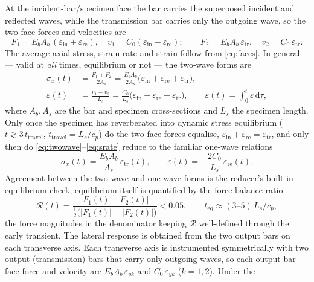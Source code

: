 \documentclass[sn-basic]{sn-jnl}
\newcommand{\Cz}{C_{0}}
\newcommand{\eps}{\varepsilon}
\newcommand{\epsd}{\dot{\varepsilon}}
\begin{document}
At the incident-bar/specimen face the bar carries the superposed incident and
reflected waves, while the transmission bar carries only the outgoing wave, so the
two face forces and velocities are
\begin{equation}
F_1=E_bA_b\,(\eps_{\mathrm{in}}+\eps_{\mathrm{re}}),\quad
v_1=\Cz(\eps_{\mathrm{in}}-\eps_{\mathrm{re}});\qquad
F_2=E_bA_b\,\eps_{\mathrm{tr}},\quad
v_2=\Cz\,\eps_{\mathrm{tr}}.
\label{eq:faces}
\end{equation}
The average axial stress, strain rate and strain follow from \eqref{eq:faces}. In
general --- valid at \emph{all} times, equilibrium or not --- the two-wave forms are
\begin{align}
\sigma_x(t) &= \frac{F_1+F_2}{2A_s}=\frac{E_b A_b}{2 A_s}\big(\eps_{\mathrm{in}}+\eps_{\mathrm{re}}+\eps_{\mathrm{tr}}\big), \label{eq:twowave}\\
\epsd(t)    &= \frac{v_1-v_2}{L_s}=\frac{\Cz}{L_s}\big(\eps_{\mathrm{in}}-\eps_{\mathrm{re}}-\eps_{\mathrm{tr}}\big), \qquad
\eps(t)=\int_0^t \epsd\,\mathrm{d}\tau, \label{eq:srate}
\end{align}
where $A_b,A_s$ are the bar and specimen cross-sections and $L_s$ the specimen
length. Only once the specimen has reverberated into dynamic stress equilibrium
($t\gtrsim 3\,t_{\mathrm{travel}}$, $t_{\mathrm{travel}}=L_s/c_p$) do the two face
forces equalise, $\eps_{\mathrm{in}}+\eps_{\mathrm{re}}=\eps_{\mathrm{tr}}$, and
only then do \eqref{eq:twowave}--\eqref{eq:srate} reduce to the familiar one-wave
relations
\begin{equation}
\sigma_x(t)=\frac{E_b A_b}{A_s}\,\eps_{\mathrm{tr}}(t),\qquad
\epsd(t)=-\frac{2\Cz}{L_s}\,\eps_{\mathrm{re}}(t).
\label{eq:onewave}
\end{equation}
Agreement between the two-wave and one-wave forms is the reducer's built-in
equilibrium check; equilibrium itself is quantified by the force-balance ratio
\begin{equation}
\mathcal{R}(t)=\frac{|F_1(t)-F_2(t)|}{\tfrac12\big(|F_1(t)|+|F_2(t)|\big)}<0.05,
\qquad t_{\mathrm{eq}}\approx(3\text{--}5)\,L_s/c_p,
\label{eq:equil}
\end{equation}
the force magnitudes in the denominator keeping $\mathcal{R}$ well-defined through
the early transient.
The lateral response is obtained from the two output bars on each transverse
axis. Each transverse axis is instrumented symmetrically with two output
(transmission) bars that carry only outgoing waves, so each output-bar face force
and velocity are $E_bA_b\,\eps_{yk}$ and $\Cz\,\eps_{yk}$ ($k=1,2$). Under the
\end{document}
